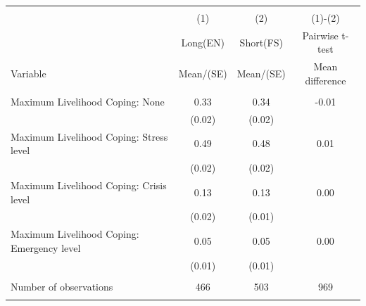 
\begin{tabular}{@{\extracolsep{5pt}}lccc}
\\[-1.8ex]\hline \hline \\[-1.8ex]
 & \multicolumn{1}{c}{(1)}  & \multicolumn{1}{c}{(2)}  & \multicolumn{1}{c}{(1)-(2)} \\
 & \multicolumn{1}{c}{Long(EN)}  & \multicolumn{1}{c}{Short(FS)}  & \multicolumn{1}{c}{Pairwise t-test}  \\
Variable & Mean/(SE) & Mean/(SE) & Mean difference \\ \hline \\[-1.8ex] 
Maximum Livelihood Coping: None   & 0.33    & 0.34    & -0.01   \\
 & (0.02)  & (0.02)  &  \\ [1ex]
Maximum Livelihood Coping: Stress level   & 0.49    & 0.48    & 0.01   \\
 & (0.02)  & (0.02)  &  \\ [1ex]
Maximum Livelihood Coping: Crisis level   & 0.13    & 0.13    & 0.00   \\
 & (0.02)  & (0.01)  &  \\ [1ex]
Maximum Livelihood Coping: Emergency level   & 0.05    & 0.05    & 0.00   \\
 & (0.01)  & (0.01)  &  \\ [1ex]
\hline \\[-1.8ex]
Number of observations  & 466   & 503  & 969  \\
\hline \hline \\[-1.8ex]

\end{tabular}
